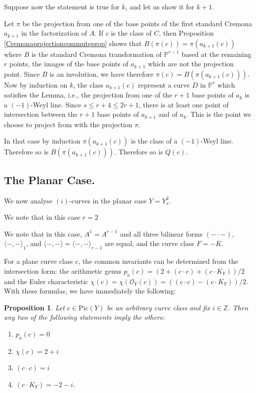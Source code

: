 \documentclass[12pt]{article}
\newtheorem{proposition}[equation]{Proposition}
\numberwithin{equation}{section}
\numberwithin{subeq}{equation}
\def\calO{\mathcal{O}}
\def\bbP{\mathbb{P}}
\begin{document}
Suppose now the statement is true for $k$, and let us show it for $k+1$.

Let $\pi$ be the projection from one of the base points of the first standard Cremona $a_{k+1}$ in the factorization of $A$.
If $c$ is the class of $C$, then Proposition \ref{Cremonaprojectioncommuteprop} shows that
$B(\pi(c)) = \pi(a_{k+1}(c)) $
where $B$ is the standard Cremona transformation of $\bbP^{r-1}$ 
based at the remaining $r$ points,
the images of the base points of $a_{k+1}$ which are not the projection point.
Since $B$ is an involution, we have therefore
$\pi(c) = B(\pi(a_{k+1}(c)))$.
Now by induction on $k$,
the class $a_{k+1}(c)$ represent a curve $D$ in $\bbP^r$ which satisfies the Lemma,
i.e., the projection from one of the $r+1$ base points of $a_k$ is a $(-1)$-Weyl line.
Since $s \leq r+4 \leq 2r+1$, 
there is at least one point of intersection between the $r+1$ base points of $a_{k+1}$ 
and of $a_k$. 
This is the point we choose to project from with the projection $\pi$.

In that case by induction $\pi(a_{k+1}(c))$ is the class of a $(-1)$-Weyl line.
Therefore so is $B(\pi(a_{k+1}(c)))$.
Therefore so is $Q(c)$.



\subsection{The Planar Case.}\label{section planar}

We now analyse $(i)$-curves in the planar case $Y=Y^2_{s}$.

We note that in this case $r=2$

We note that in this case, $A^1 = A^{r-1}$ and all three bilinear forms
$(-\cdot -)$, $\langle -,-\rangle_1$, 
and $\langle -,-\rangle = \langle -,-\rangle_{r-1}$ are equal,
and the curve class $F = -K$.

For a plane curve class $c$, the common invariants can be determined from
the intersection form:
the arithmetic genus $p_a(c) = (2+(c\cdot c)+ (c\cdot K_Y))/{2}$
and the Euler characteristic $\chi(c) = \chi(\calO_Y(c)) = ((c\cdot c)- (c\cdot K_Y))/{2}$.
With these formulas, we have immediately the following:

\begin{proposition}\label{planar}
Let $c\in \text{Pic}(Y)$ be an arbitrary curve class and fix $i\in \mathbb{Z}$.
Then any two of the following statements imply the others:
\begin{enumerate} 
\item $p_a(c)=0$
\item $\chi(c)=2+i$
\item $(c \cdot c)=i$
\item $(c \cdot K_Y) = -2-i$.
\end{enumerate}
\end{proposition}
\end{document}
